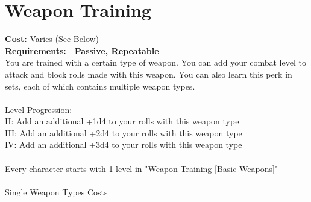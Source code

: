 \section*{Weapon Training}
\textbf{Cost:} Varies (See Below)\\
\textbf{Requirements:} -
\textbf{Passive, Repeatable}\\

You are trained with a certain type of weapon. You can add your combat level to attack and block rolls made with this weapon. You can also learn this perk in sets, each of which contains multiple weapon types.\\
\\
Level Progression:\\
II: Add an additional +1d4 to your rolls with this weapon type\\
III: Add an additional +2d4 to your rolls with this weapon type\\
IV: Add an additional +3d4 to your rolls with this weapon type\\
\\
Every character starts with 1 level in "Weapon Training [Basic Weapons]"\\
\\
Single Weapon Types Costs\\
